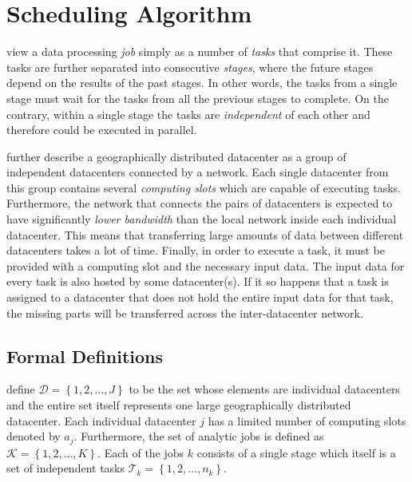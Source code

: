 \section{Scheduling Algorithm}
\label{sec:scheduling-algorithm}

\citet{Chen2017} view a data processing \emph{job} simply as a number of \emph{tasks} that comprise it. These tasks are further separated into consecutive \emph{stages}, where the future stages depend on the results of the past stages. In other words, the tasks from a single stage must wait for the tasks from all the previous stages to complete. On the contrary, within a single stage the tasks are \emph{independent} of each other and therefore could be executed in parallel.

\citet{Chen2017} further describe a geographically distributed datacenter as a group of independent datacenters connected by a network. Each single datacenter from this group contains several \emph{computing slots} which are capable of executing tasks. Furthermore, the network that connects the pairs of datacenters is expected to have significantly \emph{lower bandwidth} than the local network inside each individual datacenter. This means that transferring large amounts of data between different datacenters takes a lot of time. Finally, in order to execute a task, it must be provided with a computing slot and the necessary input data. The input data for every task is also hosted by some datacenter(s). If it so happens that a task is assigned to a datacenter that does not hold the entire input data for that task, the missing parts will be transferred across the inter-datacenter network.

\subsection{Formal Definitions}

\citet{Chen2017} define \(\mathcal{D} = \left\{1, 2, \dots, J\right\}\) to be the set whose elements are individual datacenters and the entire set itself represents one large geographically distributed datacenter. Each individual datacenter \(j\) has a limited number of computing slots denoted by \(a_j\). Furthermore, the set of analytic jobs is defined as \(\mathcal{K} = \left\{1, 2, \dots, K\right\}\). Each of the jobs \(k\) consists of a single stage which itself is a set of independent tasks \(\mathcal{T}_k=\left\{1, 2, \dots, n_k\right\}\).

